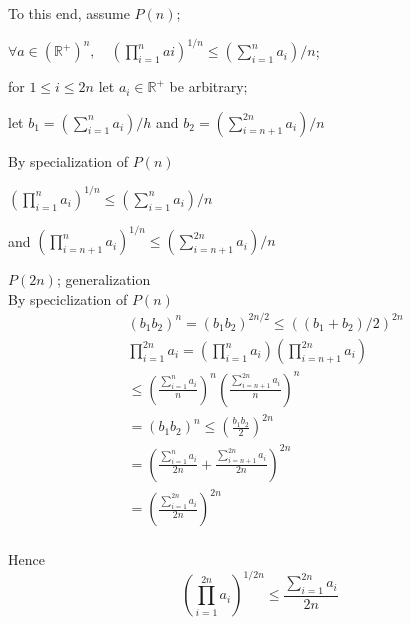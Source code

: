 \documentclass[12pt]{alittlebear}
\newcommand{\iimplies}{\,\,\mathrm{IMPLIES}\,\,}
\begin{document}
{{\begin{adjustwidth}{1cm}{}
            To this end, assume $P(n)$;

            $\displaystyle \forall a \in\left(\mathbb{R}^{+}\right)^n, \quad\left(\prod_{i=1}^n a i\right)^{1 / n} \leq\left(\sum_{i=1}^n a_i\right) / n$;

            for $1 \leq i \leq 2 n$ let $a_i \in \mathbb{R}^{+}$ be arbitrary;

            let $\displaystyle b_1=\left(\sum_{i=1}^n a_i\right) / h$ and $\displaystyle b_2=\left(\sum_{i=n+1}^{2 n} a_i\right) / n$

            By specialization of $P(n)$

            $\displaystyle 
            \left(\prod_{i=1}^n a_i\right)^{1 / n} \leq\left(\sum_{i=1}^n a_i\right) / n
            $

            and $\displaystyle\left(\prod_{i=n+1}^n a_i\right)^{1 / n} \leq\left(\sum_{i=n+1}^{2 n} a_i\right) / n$

            $P(2 n)$; generalization\\

            By speciclization of $P(n)$
            $$
            \begin{aligned}
            & \left(b_1 b_2\right)^n=\left(b_1 b_2\right)^{2 n / 2} \leq\left(\left(b_1+b_2\right) / 2\right)^{2 n} \\
            & \prod_{i=1}^{2 n} a_i=\left(\prod_{i=1}^n a_i\right)\left(\prod_{i=n+1}^{2 n} a_i\right) \\
            & \leq\left(\frac{\displaystyle\sum_{i=1}^n a_i}{n}\right)^n\left(\frac{\displaystyle\sum_{i=n+1}^{2 n} a_i}{n}\right)^n \\
            & =\left(b_1 b_2\right)^n \leq\left(\frac{b_1 b_2}{2}\right)^{2 n} \\
            & =\left(\frac{\displaystyle\sum_{i=1}^n a_i}{2 n}+\frac{\displaystyle\sum_{i=n+1}^{2 n} a_i}{2 n}\right)^{2 n} \\
            & =\left(\frac{\displaystyle\sum_{i=1}^{2 n} a_i}{2 n}\right)^{2 n} \\
            &
            \end{aligned}
            $$

            Hence
            $$
            \left(\prod_{i=1}^{2 n} a_i\right)^{1 / 2 n} \leq \frac{\displaystyle\sum_{i=1}^{2 n} a_i}{2 n}
            $$
        \end{adjustwidth}

    }
}


\end{document}
